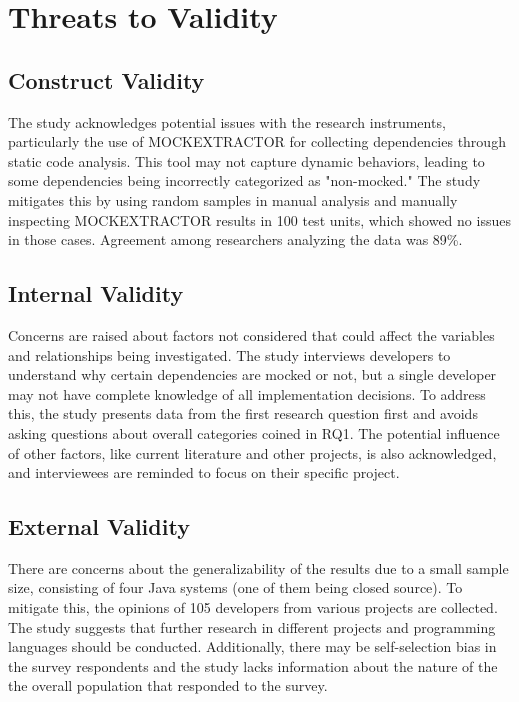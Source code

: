 \documentclass[11pt,a4paper]{article}
\begin{document}
\section{Threats to Validity}

\subsection{Construct Validity}

The study acknowledges potential issues with the research instruments, 
particularly the use of MOCKEXTRACTOR for collecting dependencies through static 
code analysis. This tool may not capture dynamic behaviors, leading to 
some dependencies being incorrectly categorized as "non-mocked." 
The study mitigates this by using random samples in manual analysis and 
manually inspecting MOCKEXTRACTOR results in 100 test units, 
which showed no issues in those cases. Agreement among researchers analyzing 
the data was 89\%.

\subsection{Internal Validity}

Concerns are raised about factors not considered that could affect the 
variables and relationships being investigated. The study interviews developers to 
understand why certain dependencies are mocked or not, but a single developer 
may not have complete knowledge of all implementation decisions. 
To address this, the study presents data from the first research question first and 
avoids asking questions about overall categories coined in RQ1. 
The potential influence of other factors, like current literature and other projects, 
is also acknowledged, and interviewees are reminded to focus on their specific project.

\subsection{External Validity}

There are concerns about the generalizability of the results due to a small sample size, 
consisting of four Java systems (one of them being closed source). 
To mitigate this, the opinions of 105 developers from various projects are collected. 
The study suggests that further research in different projects and programming languages 
should be conducted. Additionally, there may be self-selection bias in the 
survey respondents and the study lacks information about the nature of the 
the overall population that responded to the survey.
\end{document}
